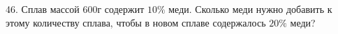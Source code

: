 46. Сплав массой 600г содержит $10\%$ меди. Сколько меди нужно добавить к этому количеству сплава, чтобы в новом сплаве содержалось $20\%$ меди?\\
